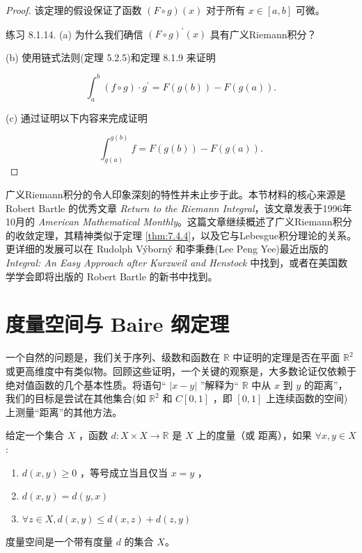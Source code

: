 \begin{proof}
  该定理的假设保证了函数 \(\left( {F \circ  g}\right) \left( x\right)\) 对于所有 \(x \in  \left\lbrack  {a,b}\right\rbrack\) 可微。

练习 8.1.14. (a) 为什么我们确信 \({\left( F \circ  g\right) }^{\prime }\left( x\right)\) 具有广义Riemann积分？

(b) 使用链式法则(定理 5.2.5)和定理 8.1.9 来证明

\[
{\int }_{a}^{b}\left( {f \circ  g}\right)  \cdot  {g}^{\prime } = F\left( {g\left( b\right) }\right)  - F\left( {g\left( a\right) }\right) .
\]

(c) 通过证明以下内容来完成证明

\[
{\int }_{g\left( a\right) }^{g\left( b\right) }f = F\left( {g\left( b\right) }\right)  - F\left( {g\left( a\right) }\right) .
\]

\end{proof}

广义Riemann积分的令人印象深刻的特性并未止步于此。本节材料的核心来源是 Robert Bartle 的优秀文章 \textit{Return to the Riemann Integral}，该文章发表于1996年10月的 \textit{American Mathematical Monthly}。这篇文章继续概述了广义Riemann积分的收敛定理，其精神类似于定理 \ref{thm:7.4.4}，以及它与Lebesgue积分理论的关系。更详细的发展可以在 Rudolph Výborný 和李秉彝(Lee Peng Yee)最近出版的\textit{Integral: An Easy Approach after Kurzweil and Henstock} 中找到，或者在美国数学学会即将出版的 Robert Bartle 的新书中找到。


\section{度量空间与 Baire 纲定理}
\label{sec:8.2}
一个自然的问题是，我们关于序列、级数和函数在 \(\mathbb{R}\) 中证明的定理是否在平面 \({\mathbb{R}}^{2}\) 或更高维度中有类似物。回顾这些证明，一个关键的观察是，大多数论证仅依赖于绝对值函数的几个基本性质。将语句“ \(\left| {x - y}\right|\) ”解释为“ \(\mathbb{R}\) 中从 \(x\) 到 \(y\) 的距离”，我们的目标是尝试在其他集合(如 \({\mathbb{R}}^{2}\) 和 \(C\left\lbrack  {0,1}\right\rbrack\) ，即 \(\left\lbrack  {0,1}\right\rbrack\) 上连续函数的空间)上测量“距离”的其他方法。

\begin{Def}
  \label{def:8.2.1}
  给定一个集合 \(X\) ，函数 \(d : X \times  X \rightarrow  \mathbb{R}\) 是 \(X\) 上的度量（或 距离），如果
  \(\forall x,y \in  X\) :

  \begin{enumerate}[label = (\roman*)]
  \item\label{item:8.2.1} \(d\left( {x,y}\right)  \geq  0\) ，等号成立当且仅当 \(x = y\) ，
  \item\label{item:8.2.2} \(d\left( {x,y}\right)  = d\left( {y,x}\right)\) 
  \item\label{item:8.2.3} \(\forall z \in  X,d\left( {x,y}\right)  \leq  d\left( {x,z}\right)  + d\left( {z,y}\right)\) 
  \end{enumerate}

度量空间是一个带有度量 \(d\) 的集合 \(X\)。
\end{Def}


